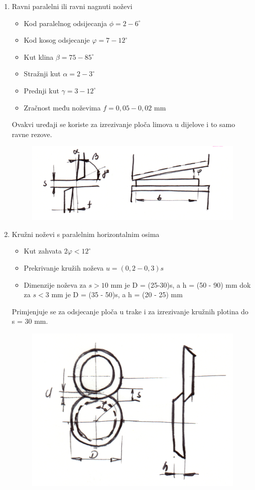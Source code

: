 \documentclass[a4paper,12pt]{article}
\numberwithin{figure}{section}
\begin{document}
\begin{enumerate}
\item Ravni paralelni ili ravni nagnuti noževi
\begin{itemize}
\item Kod paralelnog odsijecanja $\phi = 2-6^{\circ}$
\item Kod kosog odsjecanje $\varphi = 7-12^{\circ}$
\item Kut klina $\beta = 75-85^{\circ}$
\item Stražnji kut $\alpha = 2-3^{\circ}$
\item Prednji kut $\gamma = 3-12^{\circ}$
\item Zračnost među noževima $f=0,05-0,02$ mm 
\end{itemize}
Ovakvi uređaji se koriste za izrezivanje ploča limova u dijelove i to samo ravne rezove.
\begin{figure}[!h]
\centering
\includegraphics[scale=0.2]{image_54-1.png}
\end{figure}
\FloatBarrier
\item Kružni noževi s paralelnim horizontalnim osima
\begin{itemize}
\item Kut zahvata $2\varphi<12^{\circ}$
\item Prekrivanje kružih noževa  $u = (0,2-0,3)s$
\item Dimenzije noževa za $s>10$ mm je D = (25-30)s, a h = (50 - 90) mm dok za $s<3$ mm je D = (35 - 50)s, a h = (20 - 25) mm
\end{itemize}
Primjenjuje se za odsjecanje ploča u trake i za izrezivanje kružnih plotina do s = 30 mm.
\begin{figure}[!h]
\centering
\includegraphics[scale=0.2]{image_54-2.png}

\end{figure}
\end{enumerate}
\end{document}

